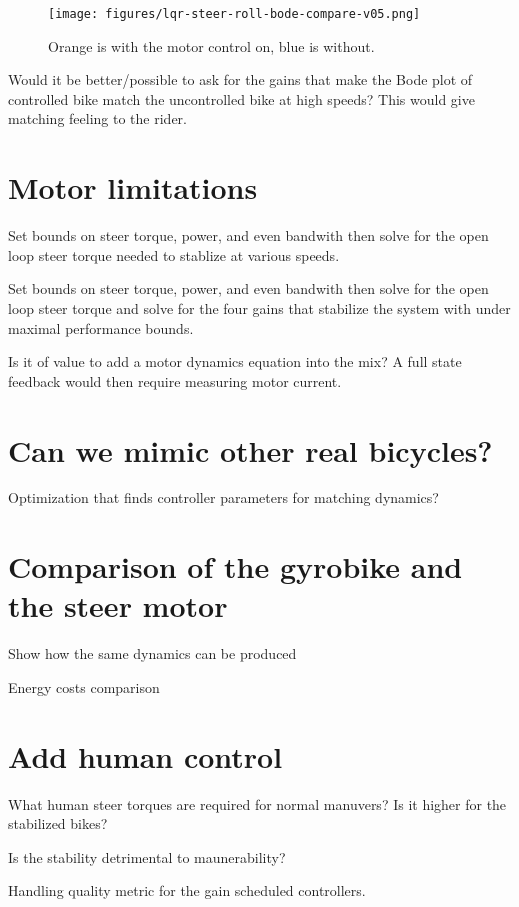 \documentclass[12pt]{article}
\begin{document}
\begin{figure}
  \centering
  \texttt{[image: figures/lqr-steer-roll-bode-compare-v05.png]}
  \caption{Orange is with the motor control on, blue is without.}
  \label{fig:lqr-steer-roll-bode-compare}
\end{figure}

Would it be better/possible to ask for the gains that make the Bode plot of
controlled bike match the uncontrolled bike at high speeds? This would give
matching feeling to the rider.

\section{Motor limitations}

Set bounds on steer torque, power, and even bandwith then solve for the open
loop steer torque needed to stablize at various speeds.

Set bounds on steer torque, power, and even bandwith then solve for the open
loop steer torque and solve for the four gains that stabilize the system with
under maximal performance bounds.

Is it of value to add a motor dynamics equation into the mix? A full state
feedback would then require measuring motor current.

\section{Can we mimic other real bicycles?}

Optimization that finds controller parameters for matching dynamics?

\section{Comparison of the gyrobike and the steer motor}

Show how the same dynamics can be produced

Energy costs comparison

\section{Add human control}

What human steer torques are required for normal manuvers? Is it higher for the
stabilized bikes?

Is the stability detrimental to maunerability?

Handling quality metric for the gain scheduled controllers.



\end{document}
